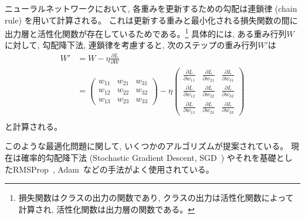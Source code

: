 ニューラルネットワークにおいて, 各重みを更新するための勾配は連鎖律 (chain rule) を用いて計算される。
これは更新する重みと最小化される損失関数の間に出力層と活性化関数が存在しているためである。\footnote{損失関数はクラスの出力の関数であり, クラスの出力は活性化関数によって計算され, 活性化関数は出力層の関数である。}
具体的には, ある重み行列$W$に対して, 勾配降下法, 連鎖律を考慮すると, 次のステップの重み行列$W'$は
\begin{equation}
 \begin{split}
  W' &= W - \eta \frac{\partial L}{\partial W}\\
    &=
  \left(
    \begin{array}{ccc}
      w_{11} & w_{21} & w_{31} \\
      w_{12} & w_{22} & w_{32} \\
      w_{13} & w_{23} & w_{33}
    \end{array}
  \right)
  - \eta
  \left(
    \begin{array}{ccc}
      \frac{\partial L}{\partial w_{11}} & \frac{\partial L}{\partial w_{21}} & \frac{\partial L}{\partial w_{31}} \\
      \frac{\partial L}{\partial w_{12}} & \frac{\partial L}{\partial w_{22}} & \frac{\partial L}{\partial w_{32}} \\
      \frac{\partial L}{\partial w_{13}} & \frac{\partial L}{\partial w_{23}} & \frac{\partial L}{\partial w_{33}}
    \end{array}
  \right)\\
 \end{split}
\end{equation}
と計算される。

このような最適化問題に関して, いくつかのアルゴリズムが提案されている。
現在は確率的勾配降下法 (Stochastic Gradient Descent, SGD~\cite{SGD}) やそれを基礎としたRMSProp~\cite{RMSProp}, Adam~\cite{Adam}などの手法がよく使用されている。

